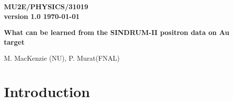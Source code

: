 \documentclass[12pt]{article}
\newcommand {\mumepconv}[1][A] {%
  \def\ArgI{{#1}}%
  \mumepconvRelay
}
\newcommand \mumepconvRelay[1][A]  {\mbox{$\mu^- \textrm{\ArgI} \rightarrow e^+ \textrm{#1}$}}
\begin{document}
\begin{titlepage}
  \begin{flushright}
    \bf {MU2E/PHYSICS/31019} \\
    version 1.0
    \today
  \end{flushright}

  \vspace{1cm}
  
  \begin{center}
    {\Large \bf What can be learned from the SINDRUM-II positron data on Au target} 
    
    \vspace{1cm}
    
    M. MacKenzie (NU), P. Murat(FNAL)
    
    \vspace{0.3cm}
    
    \vspace{0.8cm}                           
  \end{center}

  \begin{abstract}

    Positron data of the SINDRUM-II experiment on Au target have
    an interesting feature near the spectrum endpoint.
    We are trying to understand implications of that for the Mu2e
    search for \mumepconv\ .
    
  \end{abstract}

\end{titlepage}
%
%
%
{\tableofcontents}

% 


\newpage
\section { Introduction}
\end{document}
